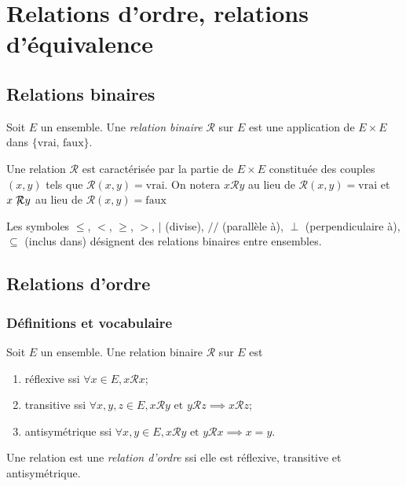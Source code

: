 \chapter{Relations d'ordre, relations d'équivalence}

\section{Relations binaires}

\begin{definition} Soit $E$ un ensemble. Une \emph{relation binaire} ${\mathcal R}$ sur $E$ est une application de $E\times E$ dans $\{\text{vrai, faux}\}$.
\end{definition}

Une relation ${\mathcal R}$ est caractérisée par la partie de $E\times E$ constituée des couples $(x,y)$ tels que ${\mathcal R}(x,y)=\text{vrai}$. On notera \og$x{\mathcal R}y$\fg{} au lieu de \og${\mathcal R}(x,y)=\text{vrai}$\fg{} et \og$x\not \hspace{-.1cm}{\mathcal R} y$\fg{} au lieu de \og${\mathcal R}(x,y)=\text{faux}$\fg{}

\begin{exemples} Les symboles $\leq$, $<$, $\geq$, $>$, $|$ (divise), $//$ (parallèle à), $\perp$ (perpendiculaire à), $\subseteq$ (inclus dans) désignent des relations binaires entre ensembles.
\end{exemples}

\section{Relations d'ordre}

\subsection{Définitions et vocabulaire}

\begin{definition}
Soit $E$ un ensemble. Une relation binaire ${\mathcal R}$ sur $E$ est
\begin{enumerate}
\item réflexive ssi $\forall x\in E, x{\mathcal R}x$;
\item transitive ssi $\forall x, y, z\in E, x\mathcal Ry \text{ et } y{\mathcal R}z \implies x{\mathcal R}z$;
\item antisymétrique ssi $\forall x, y \in E, x{\mathcal R}y\text{ et } y{\mathcal R}x \implies x=y$.
\end{enumerate}

Une relation est une \emph{relation d'ordre} ssi elle est réflexive, transitive et antisymétrique.
\end{definition}

